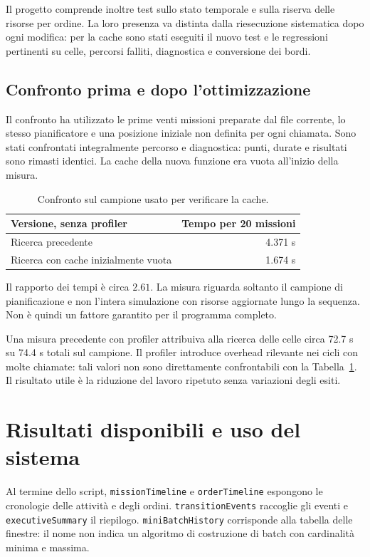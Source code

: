 Il progetto comprende inoltre test sullo stato temporale e sulla riserva
delle risorse per ordine. La loro presenza va distinta dalla riesecuzione
sistematica dopo ogni modifica: per la cache sono stati eseguiti il nuovo
test e le regressioni pertinenti su celle, percorsi falliti, diagnostica
e conversione dei bordi.

\subsection{Confronto prima e dopo l'ottimizzazione}

Il confronto ha utilizzato le prime venti missioni preparate dal file
corrente, lo stesso pianificatore e una posizione iniziale non definita
per ogni chiamata. Sono stati confrontati integralmente percorso e
diagnostica: punti, durate e risultati sono rimasti identici. La cache
della nuova funzione era vuota all'inizio della misura.

\begin{table}[htbp]
\centering
\begin{tabular}{lr}
\toprule
Versione, senza profiler & Tempo per 20 missioni\\
\midrule
Ricerca precedente & 4.371 s\\
Ricerca con cache inizialmente vuota & 1.674 s\\
\bottomrule
\end{tabular}
\caption{Confronto sul campione usato per verificare la cache.}
\label{tab:impl-benchmark}
\end{table}

Il rapporto dei tempi è circa $2.61$. La misura riguarda soltanto il campione
di pianificazione e non l'intera simulazione con risorse aggiornate lungo
la sequenza. Non è quindi un fattore garantito per il programma completo.

Una misura precedente con profiler attribuiva alla ricerca delle celle
circa 72.7 s su 74.4 s totali sul campione. Il profiler introduce overhead
rilevante nei cicli con molte chiamate: tali valori non sono direttamente
confrontabili con la Tabella~\ref{tab:impl-benchmark}. Il risultato utile
è la riduzione del lavoro ripetuto senza variazioni degli esiti.

\section{Risultati disponibili e uso del sistema}
\label{sec:impl-risultati}

Al termine dello script, \texttt{missionTimeline} e \texttt{orderTimeline}
espongono le cronologie delle attività e degli ordini.
\texttt{transitionEvents} raccoglie gli eventi e \texttt{executiveSummary}
il riepilogo. \texttt{miniBatchHistory} corrisponde alla tabella delle
finestre: il nome non indica un algoritmo di costruzione di batch con
cardinalità minima e massima.

